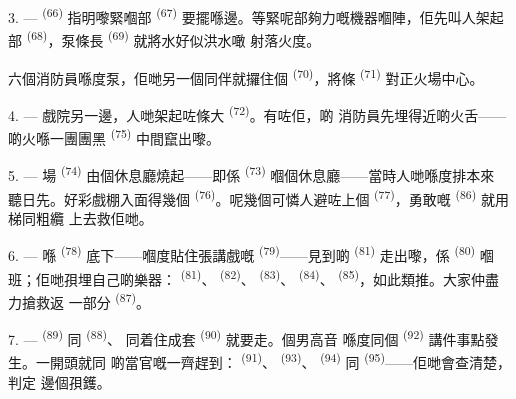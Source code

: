 3. ---  \textsuperscript{(66)} 指明嚟緊嗰部
\textsuperscript{(67)} 要擺喺邊。等緊呢部夠力嘅機器嗰陣，佢先叫人架起部
 \textsuperscript{(68)}，泵條長 \textsuperscript{(69)} 就將水好似洪水噉
射落火度。

六個消防員喺度泵，佢哋另一個同伴就攞住個 \textsuperscript{(70)}，將條
 \textsuperscript{(71)} 對正火場中心。

4. --- 戲院另一邊，人哋架起咗條大 \textsuperscript{(72)}。有咗佢，啲
消防員先埋得近啲火舌——啲火喺一團團黑 \textsuperscript{(75)} 中間竄出嚟。

\VUsaut{5.0mm}
\VUsaut{3.4mm}

5. --- 場 \textsuperscript{(74)} 由個休息廳燒起——即係
\textsuperscript{(73)} 嗰個休息廳——當時人哋喺度排本來
聽日先。好彩戲棚入面得幾個 \textsuperscript{(76)}。呢幾個可憐人避咗上個
 \textsuperscript{(77)}，勇敢嘅 \textsuperscript{(86)} 就用梯同粗纜
上去救佢哋。

6. --- 喺 \textsuperscript{(78)} 底下——嗰度貼住張講戲嘅
\textsuperscript{(79)}——見到啲 \textsuperscript{(81)} 走出嚟，係
\textsuperscript{(80)} 嗰班；佢哋孭埋自己啲樂器： \textsuperscript{(81)}、
 \textsuperscript{(82)}、 \textsuperscript{(83)}、
\textsuperscript{(84)}、 \textsuperscript{(85)}，如此類推。大家仲盡力搶救返
一部分 \textsuperscript{(87)}。

7. ---  \textsuperscript{(89)} 同 \textsuperscript{(88)}、
同着住成套 \textsuperscript{(90)} 就要走。個男高音
喺度同個 \textsuperscript{(92)} 講件事點發生。一開頭就同
啲當官嘅一齊趕到： \textsuperscript{(91)}、 \textsuperscript{(93)}、
 \textsuperscript{(94)} 同 \textsuperscript{(95)}——佢哋會查清楚，判定
邊個孭鑊。

\VUsaut{6.0mm}
\VUfilet{22mm}
